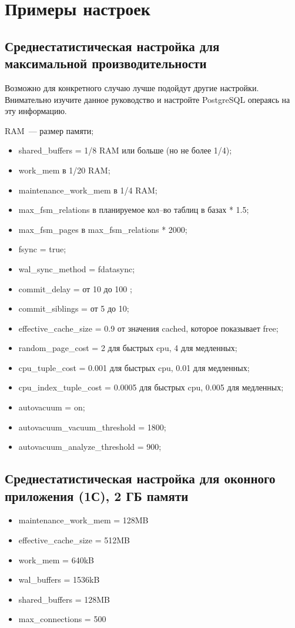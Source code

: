 \section{Примеры настроек}

\subsection{Среднестатистическая настройка для максимальной производительности}

Возможно для конкретного случаю лучше подойдут другие настройки. Внимательно изучите данное руководство и настройте 
PostgreSQL операясь на эту информацию.

RAM~--- размер памяти;
\begin{itemize}
\item shared\_buffers = 1/8 RAM или больше (но не более 1/4);
\item work\_mem в 1/20 RAM;
\item maintenance\_work\_mem в 1/4 RAM;
\item max\_fsm\_relations в планируемое кол--во таблиц в базах * 1.5;
\item max\_fsm\_pages в max\_fsm\_relations * 2000;
\item fsync = true;
\item wal\_sync\_method = fdatasync;
\item commit\_delay = от 10 до 100 ;
\item commit\_siblings = от 5 до 10;
\item effective\_cache\_size = 0.9 от значения cached, которое показывает free;
\item random\_page\_cost = 2 для быстрых cpu, 4 для медленных;
\item cpu\_tuple\_cost = 0.001 для быстрых cpu, 0.01 для медленных;
\item cpu\_index\_tuple\_cost = 0.0005 для быстрых cpu, 0.005 для медленных;
\item autovacuum = on;
\item autovacuum\_vacuum\_threshold = 1800;
\item autovacuum\_analyze\_threshold = 900;
\end{itemize}

\subsection{Среднестатистическая настройка для оконного приложения (1С), 2 ГБ памяти}

\begin{itemize}
\item maintenance\_work\_mem = 128MB
\item effective\_cache\_size = 512MB
\item work\_mem = 640kB
\item wal\_buffers = 1536kB
\item shared\_buffers = 128MB
\item max\_connections = 500
\end{itemize}

